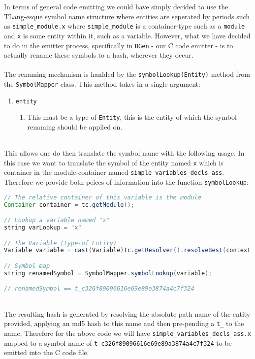 In terms of general code emitting we could have simply decided to
use the TLang-esque symbol name structure where entities are seperated
by periods such as \texttt{simple\_module.x} where \texttt{simple\_module}
is a container-type such as a \texttt{module} and \texttt{x} is
some entity within it, such as a variable. However, what we have decided
to do in the emitter process, specifically in \texttt{DGen} - our
C code emitter - is to actually rename these symbols to a hash, wherever
they occur.\\
\\
The renaming mechanism is hanlded by the \texttt{symbolLookup(Entity)}
method from the \texttt{SymbolMapper} class. This method takes in
a single argument:
\begin{enumerate}
\item \texttt{entity}
\begin{enumerate}
\item This must be a type-of \texttt{Entity}, this is the entity of which
the symbol renaming should be applied on.
\end{enumerate}
\end{enumerate}
~\\
This allows one do then translate the symbol name with the following
usage. In this case we want to translate the symbol of the entity
named \texttt{x} which is container in the module-container named
\texttt{simple\_variables\_decls\_ass}. Therefore we provide both
peices of information into the function \texttt{symbolLookup}:\begin{lstlisting}[language=Java]
// The relative container of this variable is the module
Container container = tc.getModule();

// Lookup a variable named "x"
string varLookup = "x"

// The Variable (type-of Entity)
Variable variable = cast(Variable)tc.getResolver().resolveBest(context.getContainer(), varLookup);

// Symbol map
string renamedSymbol = SymbolMapper.symbolLookup(variable);

// renamedSymbol == t_c326f89096616e69e89a3874a4c7f324
\end{lstlisting}~\\
The resulting hash is generated by resolving the absolute path name
of the entity provided, applying an md5 hash to this name and then
pre-pending a \texttt{t\_} to the name. Therefore for the above code
we will have \texttt{simple\_variables\_decls\_ass.x} mapped to a
symbol name of \texttt{t\_c326f89096616e69e89a3874a4c7f324} to be
emitted into the C code file.
